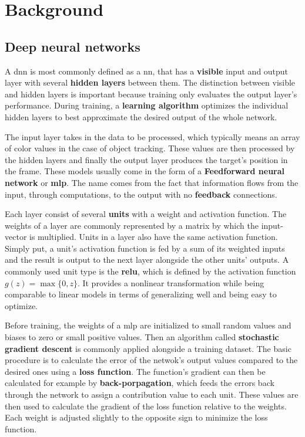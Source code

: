 \section{Background}

\subsection{Deep neural networks}

A \ac{dnn} is most commonly defined as a \ac{nn}, that has a \textbf{visible} input
and output layer with several \textbf{hidden layers} between them. The distinction
between visible and hidden layers is important because training only evaluates the
output layer's performance. During training, a \textbf{learning algorithm} optimizes the
individual hidden layers to best approximate the desired output of the whole network.

The input layer takes in the data to be processed, which typically means an array
of color values in the case of object tracking. These values are then processed
by the hidden layers and finally the output layer produces the target's position
in the frame. These models usually come in the form of a \textbf{Feedforward neural network}
or \textbf{\ac{mlp}}. The name comes from the fact that information flows from the
input, through computations, to the output with no \textbf{feedback} connections.
\\

Each layer consist of several \textbf{units} with a weight and activation function. The
weights of a layer are commonly represented by a matrix by which the input-vector is
multiplied. Units in a layer also have the same activation function. Simply put, a unit's
activation function is fed by a sum of its weighted inputs and the result is output to 
the next layer alongside the other units' outputs. A commonly used unit type is the 
\textbf{\ac{relu}}, which is defined by the activation function $g (z) = \max\{0,z\}$.
It provides a nonlinear transformation while being comparable to linear models in terms
of generalizing well and being easy to optimize.

Before training, the weights of a \ac{mlp} are initialized to small random values and 
biases to zero or small positive values. Then an algorithm called \textbf{stochastic
gradient descent} is commonly applied alongside a training dataset. The basic procedure
is to calculate the error of the netwok's output values compared to the desired ones 
using a \textbf{loss function}. The function's gradient can then be calculated for
example by \textbf{back-porpagation}, which feeds the errors back through the network
to assign a contribution value to each unit. These values are then used to calculate
the gradient of the loss function relative to the weights. Each weight is adjusted
slightly to the opposite sign to minimize the loss function.
\\\cite{DEEP_LEARNING}

